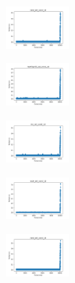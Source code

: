 \begin{figure}[H]
    \begin{subfigure}
        \centering
        \includegraphics[width=0.234\textwidth]{img/HS-LS/rand_set_const_10_277451237_time.png}
    \end{subfigure}
    \hfill
    \begin{subfigure}
        \centering
        \includegraphics[width=0.234\textwidth]{img/HS-LS/newthyroid_set_const_10_277451237_time.png}
    \end{subfigure}
    \hfill
    \begin{subfigure}
        \centering
        \includegraphics[width=0.234\textwidth]{img/HS-LS/iris_set_const_10_49258669_time.png}
    \end{subfigure}
    \hfill
    \begin{subfigure}
        \centering
        \includegraphics[width=0.234\textwidth]{img/HS-LS/ecoli_set_const_10_49258669_time.png}
    \end{subfigure}
    \hfill
    \begin{subfigure}
        \centering
        \includegraphics[width=0.234\textwidth]{img/HS-LS/rand_set_const_10_49258669_time.png}
    \end{subfigure}
    \hfill
    \begin{subfigure}
        \centering

\end{subfigure}
\end{figure}
